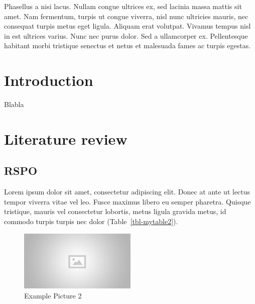 \documentclass[
  letterpaper,
  DIV=11,
  numbers=noendperiod]{scrreprt}
\begin{document}
Phasellus a nisi lacus. Nullam congue ultrices ex, sed lacinia massa
mattis sit amet. Nam fermentum, turpis ut congue viverra, nisl nunc
ultricies mauris, nec consequat turpis metus eget ligula. Aliquam erat
volutpat. Vivamus tempus nisl in est ultrices varius. Nunc nec purus
dolor. Sed a ullamcorper ex. Pellentesque habitant morbi tristique
senectus et netus et malesuada fames ac turpis egestas.

\newpage
\tableofcontents


\hypertarget{introduction}{%
\chapter{Introduction}\label{introduction}}

Blabla


\hypertarget{literature-review}{%
\chapter{Literature review}\label{literature-review}}

\hypertarget{rspo}{%
\section{RSPO}\label{rspo}}

Lorem ipsum dolor sit amet, consectetur adipiscing elit. Donec at ante
ut lectus tempor viverra vitae vel leo. Fusce maximus libero eu semper
pharetra. Quisque tristique, mauris vel consectetur lobortis, metus
ligula gravida metus, id commodo turpis turpis nec dolor
(Table~\ref{tbl-mytable2}).

\begin{figure}

{\centering \includegraphics[width=0.5\textwidth,height=\textheight]{text/placeholder.jpg}

}

\caption{Example Picture 2}

\end{figure}
\end{document}
